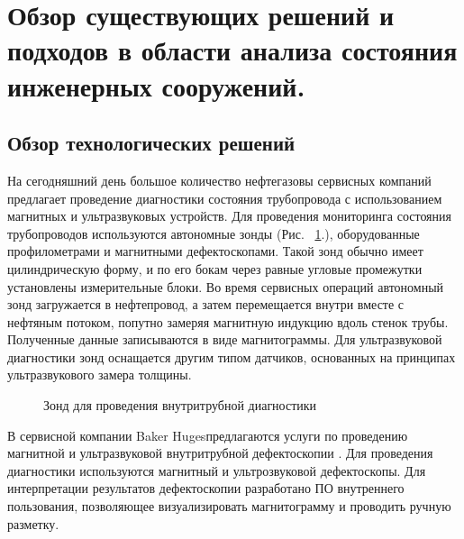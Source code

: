 \documentclass[a4paper,article,14pt]{extarticle}
\begin{document}
\pagebreak
\section{Обзор существующих решений и подходов в области анализа состояния инженерных сооружений.}

\subsection{Обзор технологических решений}

На сегодняшний день большое количество нефтегазовы сервисных компаний предлагает проведение диагностики состояния 
трубопровода с использованием магнитных и ультразвуковых устройств. Для проведения мониторинга состояния трубопроводов 
используются автономные зонды (Рис. ~\ref{image1}.), оборудованные профилометрами и магнитными дефектоскопами. Такой зонд обычно имеет 
цилиндрическую форму, и по его бокам через равные угловые промежутки установлены измерительные блоки. Во время сервисных 
операций автономный зонд загружается в нефтепровод, а затем перемещается внутри вместе с нефтяным потоком, попутно замеряя 
магнитную индукцию вдоль стенок трубы. Полученные данные записываются в виде магнитограммы. Для ультразвуковой диагностики зонд 
оснащается другим типом датчиков, основанных на принципах ультразвукового замера толщины.

\begin{figure}[ht]
    \begin{center}
    
    \caption{
    \label{image1}
    Зонд для проведения внутритрубной диагностики}
    \end {center}
\end {figure}

В сервисной компании \flqq Baker Huges\frqq предлагаются услуги по проведению магнитной и ультразвуковой внутритрубной дефектоскопии \cite{s2}.
Для проведения диагностики используются магнитный и ультрозвуковой дефектоскопы. Для интерпретации результатов дефектоскопии 
разработано ПО внутреннего пользования, позволяющее визуализировать магнитограмму и проводить ручную разметку.
\end{document}
